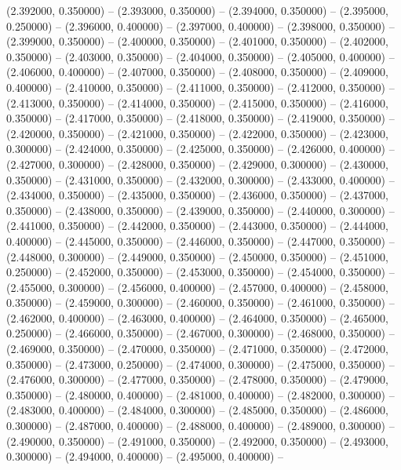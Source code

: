 (2.392000, 0.350000) -- 
(2.393000, 0.350000) -- 
(2.394000, 0.350000) -- 
(2.395000, 0.250000) -- 
(2.396000, 0.400000) -- 
(2.397000, 0.400000) -- 
(2.398000, 0.350000) -- 
(2.399000, 0.350000) -- 
(2.400000, 0.350000) -- 
(2.401000, 0.350000) -- 
(2.402000, 0.350000) -- 
(2.403000, 0.350000) -- 
(2.404000, 0.350000) -- 
(2.405000, 0.400000) -- 
(2.406000, 0.400000) -- 
(2.407000, 0.350000) -- 
(2.408000, 0.350000) -- 
(2.409000, 0.400000) -- 
(2.410000, 0.350000) -- 
(2.411000, 0.350000) -- 
(2.412000, 0.350000) -- 
(2.413000, 0.350000) -- 
(2.414000, 0.350000) -- 
(2.415000, 0.350000) -- 
(2.416000, 0.350000) -- 
(2.417000, 0.350000) -- 
(2.418000, 0.350000) -- 
(2.419000, 0.350000) -- 
(2.420000, 0.350000) -- 
(2.421000, 0.350000) -- 
(2.422000, 0.350000) -- 
(2.423000, 0.300000) -- 
(2.424000, 0.350000) -- 
(2.425000, 0.350000) -- 
(2.426000, 0.400000) -- 
(2.427000, 0.300000) -- 
(2.428000, 0.350000) -- 
(2.429000, 0.300000) -- 
(2.430000, 0.350000) -- 
(2.431000, 0.350000) -- 
(2.432000, 0.300000) -- 
(2.433000, 0.400000) -- 
(2.434000, 0.350000) -- 
(2.435000, 0.350000) -- 
(2.436000, 0.350000) -- 
(2.437000, 0.350000) -- 
(2.438000, 0.350000) -- 
(2.439000, 0.350000) -- 
(2.440000, 0.300000) -- 
(2.441000, 0.350000) -- 
(2.442000, 0.350000) -- 
(2.443000, 0.350000) -- 
(2.444000, 0.400000) -- 
(2.445000, 0.350000) -- 
(2.446000, 0.350000) -- 
(2.447000, 0.350000) -- 
(2.448000, 0.300000) -- 
(2.449000, 0.350000) -- 
(2.450000, 0.350000) -- 
(2.451000, 0.250000) -- 
(2.452000, 0.350000) -- 
(2.453000, 0.350000) -- 
(2.454000, 0.350000) -- 
(2.455000, 0.300000) -- 
(2.456000, 0.400000) -- 
(2.457000, 0.400000) -- 
(2.458000, 0.350000) -- 
(2.459000, 0.300000) -- 
(2.460000, 0.350000) -- 
(2.461000, 0.350000) -- 
(2.462000, 0.400000) -- 
(2.463000, 0.400000) -- 
(2.464000, 0.350000) -- 
(2.465000, 0.250000) -- 
(2.466000, 0.350000) -- 
(2.467000, 0.300000) -- 
(2.468000, 0.350000) -- 
(2.469000, 0.350000) -- 
(2.470000, 0.350000) -- 
(2.471000, 0.350000) -- 
(2.472000, 0.350000) -- 
(2.473000, 0.250000) -- 
(2.474000, 0.300000) -- 
(2.475000, 0.350000) -- 
(2.476000, 0.300000) -- 
(2.477000, 0.350000) -- 
(2.478000, 0.350000) -- 
(2.479000, 0.350000) -- 
(2.480000, 0.400000) -- 
(2.481000, 0.400000) -- 
(2.482000, 0.300000) -- 
(2.483000, 0.400000) -- 
(2.484000, 0.300000) -- 
(2.485000, 0.350000) -- 
(2.486000, 0.300000) -- 
(2.487000, 0.400000) -- 
(2.488000, 0.400000) -- 
(2.489000, 0.300000) -- 
(2.490000, 0.350000) -- 
(2.491000, 0.350000) -- 
(2.492000, 0.350000) -- 
(2.493000, 0.300000) -- 
(2.494000, 0.400000) -- 
(2.495000, 0.400000) -- 
